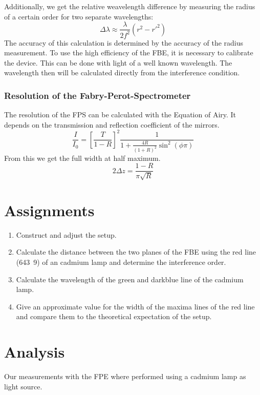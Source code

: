 \documentclass[a4paper,10pt]{article}
\begin{document}
Additionally, we get the relative weavelength difference by measuring the radius of a certain order for two separate wavelengths:
\begin{equation}
\Delta\lambda \approx \frac{\lambda}{2 f^2}\left(r^2 - r'^2\right)
\end{equation}
The accuracy of this calculation is determined by the accuracy of the radius measurement. To use the high efficiency of the FBE, it is necessary to calibrate the device. This can be done with light of a well known wavelength. The wavelength then will be calculated directly from the interference condition.

\subsubsection*{Resolution of the Fabry-Perot-Spectrometer}
The resolution of the FPS can be calculated with the Equation of Airy. It depends on the transmission and reflection coefficient of the mirrors.
\begin{equation}
\frac{I}{I_0} = \left[\frac{T}{1-R}\right]^2\frac{1}{1+\frac{4 R}{(1+R)^2}\sin^2(\phi \pi)}
\end{equation}
From this we get the full width at half maximum.
\begin{equation}
2 \Delta z = \frac{1-R}{\pi \sqrt{R}}
\end{equation}

\section{Assignments}
\begin{enumerate}
\item Construct and adjust the setup.
\item Calculate the distance between the two planes of the FBE using the red line (\unit{643.9}{\nano\meter}) of an cadmium lamp and determine the interference order.
\item Calculate the wavelength of the green and darkblue line of the cadmium lamp.
\item Give an approximate value for the width of the maxima lines of the red line and compare them to the theoretical expectation of the setup.
\end{enumerate}



\section{Analysis}
Our measurements with the FPE where performed using a cadmium lamp as light source.
\end{document}
